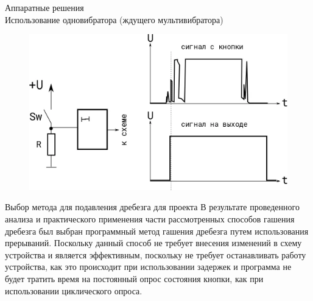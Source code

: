 \documentclass[12pt,a4paper,mathserif]{beamer}
\begin{document}
\begin{frame}{Аппаратные решения\\Использование одновибратора (ждущего мультивибратора)}
    \begin{figure}
        \centering
        \includegraphics[scale=0.6]{vibrator.png}
        \label{fig:vibrator}
    \end{figure}
\end{frame}

\begin{frame}{Выбор метода для подавления дребезга для проекта}
    \setlength{\parindent}{0.5cm}
    В результате проведенного анализа и практического применения части рассмотренных способов гашения дребезга был выбран программный метод гашения дребезга путем использования прерываний. Поскольку данный способ не требует внесения изменений в схему устройства и является эффективным, поскольку не требует останавливать работу устройства, как это происходит при использовании задержек и программа не будет тратить время на постоянный опрос состояния кнопки, как при использовании циклического опроса.
\end{frame}
\end{document}
